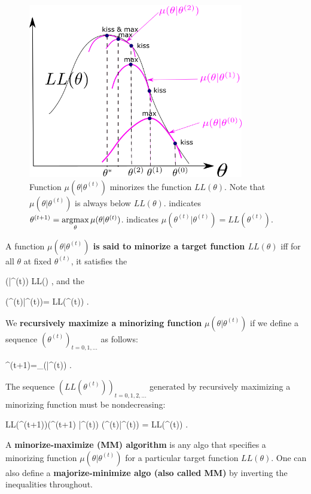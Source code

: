 \begin{figure}[h!]
\centering
\includegraphics[width=3.7in]
{emax/minorize.png}
\caption{Function $\mu(\theta|\theta^{(t)})$
minorizes the function $ LL(\theta)$.
Note that $\mu(\theta|\theta^{(t)})$
is always below
 $ LL(\theta)$.
 indicates
$\theta^{(t+1)}=
\mathop{\mathrm{argmax}}\limits_\theta \mu(\theta|\theta^{(t)})$.
 indicates
 $\mu(\theta^{(t)}|\theta^{(t)})=
 LL(\theta^{(t)})$.
}
\label{fig-minorize}
\end{figure}



A function {\bf $\mu(\theta|\theta^{(t)})$
is said to minorize
 a target
 function $ LL(\theta)$}
iff for all $ \theta$ at fixed
$\theta^{(t)}$,
it satisfies the


\beq
\mu(\theta|\theta^{(t)})\leq
 LL(\theta)
\;,
\eeq
and
the 

\beq
\mu(\theta^{(t)}|\theta^{(t)})=
 LL(\theta^{(t)})
\;.
\eeq

We  {\bf recursively maximize a minorizing function} $\mu(\theta|\theta^{(t)})$
if we define a sequence $(\theta^{(t)})_{t=0, 1, \ldots}$
as follows:

\beq
\theta^{(t+1)}=\argmax_\theta \mu(\theta|\theta^{(t)})
\;.
\eeq

The sequence
$( LL(\theta^{(t)}))_{t=0, 1, 2, \ldots}$
generated by
recursively maximizing a minorizing function
must be nondecreasing:

\beq
 LL(\theta^{(t+1)})\geq \mu(\theta^{(t+1)}
|\theta^{(t)})\geq
 \mu(\theta^{(t)}|\theta^{(t)})
=  LL(\theta^{(t)})
\;.
\eeq

A {\bf
minorize-maximize (MM) algorithm}
is any algo that
specifies a
minorizing function $\mu(\theta|\theta^{(t)})$
for a particular target
 function $ LL(\theta)$.
One can also define a
{\bf majorize-minimize algo (also
called  MM)}
by inverting the inequalities throughout.


